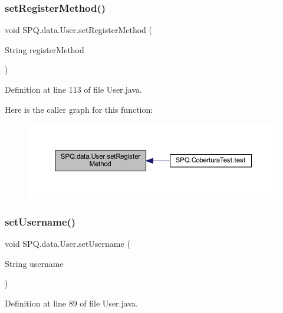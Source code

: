 \subsubsection{\texorpdfstring{set\+Register\+Method()}{setRegisterMethod()}}
{\footnotesize\ttfamily void S\+P\+Q.\+data.\+User.\+set\+Register\+Method (\begin{DoxyParamCaption}\item[{String}]{register\+Method }\end{DoxyParamCaption})}



Definition at line 113 of file User.\+java.

Here is the caller graph for this function\+:
\nopagebreak
\begin{figure}[H]
\begin{center}
\leavevmode
\includegraphics[width=350pt]{class_s_p_q_1_1data_1_1_user_a6519805f5204c8d1add91a917634f588_icgraph}
\end{center}
\end{figure}
\mbox{\label{class_s_p_q_1_1data_1_1_user_ab173655f6fbe57a59cd0da8d0cfbed06}} 
\subsubsection{\texorpdfstring{set\+Username()}{setUsername()}}
{\footnotesize\ttfamily void S\+P\+Q.\+data.\+User.\+set\+Username (\begin{DoxyParamCaption}\item[{String}]{username }\end{DoxyParamCaption})}



Definition at line 89 of file User.\+java.

